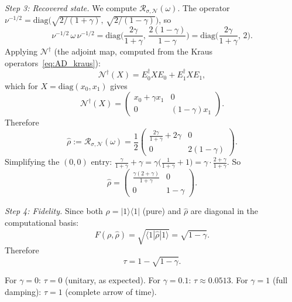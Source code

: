 \documentclass[prl,twocolumn,superscriptaddress,longbibliography]{revtex4-2}
\newcommand{\Petz}{\mathcal{R}}
\newcommand{\chan}{\mathcal{N}}
\newcommand{\ket}[1]{|#1\rangle}
\newcommand{\bra}[1]{\langle#1|}
\newcommand{\tauasym}{\tau}
\begin{document}
\emph{Step 3: Recovered state.}
We compute $\Petz_{\sigma,\chan}(\omega)$.  The operator
$\nu^{-1/2} = \mathrm{diag}\!\big(\sqrt{2/(1+\gamma)},\,
\sqrt{2/(1-\gamma)}\big)$, so
\begin{equation}
\nu^{-1/2}\,\omega\,\nu^{-1/2}
= \mathrm{diag}\!\bigg(\frac{2\gamma}{1+\gamma},\,
\frac{2(1-\gamma)}{1-\gamma}\bigg)
= \mathrm{diag}\!\bigg(\frac{2\gamma}{1+\gamma},\, 2\bigg).
\end{equation}
Applying $\chan^\dagger$ (the adjoint map, computed from the Kraus
operators~\eqref{eq:AD_kraus}):
\begin{equation}
\chan^\dagger(X) = E_0^\dagger X E_0 + E_1^\dagger X E_1,
\end{equation}
which for $X = \mathrm{diag}(x_0, x_1)$ gives
\begin{equation}
\chan^\dagger(X) = \begin{pmatrix}
x_0 + \gamma x_1 & 0 \\
0 & (1-\gamma) x_1
\end{pmatrix}.
\end{equation}
Therefore
\begin{equation}
\hat{\rho} := \Petz_{\sigma,\chan}(\omega) = \frac{1}{2}
\begin{pmatrix}
\frac{2\gamma}{1+\gamma} + 2\gamma & 0 \\
0 & 2(1-\gamma)
\end{pmatrix}.
\end{equation}
Simplifying the $(0,0)$ entry:
$\frac{\gamma}{1+\gamma} + \gamma
= \gamma\big(\frac{1}{1+\gamma} + 1\big)
= \gamma \cdot \frac{2+\gamma}{1+\gamma}$.  So
\begin{equation}
\hat{\rho} = \begin{pmatrix}
\frac{\gamma(2+\gamma)}{1+\gamma} & 0 \\
0 & 1 - \gamma
\end{pmatrix}.
\end{equation}

\emph{Step 4: Fidelity.}
Since both $\rho = \ket{1}\!\bra{1}$ (pure) and $\hat{\rho}$ are
diagonal in the computational basis:
\begin{equation}
F(\rho, \hat{\rho}) = \sqrt{\bra{1}\hat{\rho}\ket{1}}
= \sqrt{1 - \gamma}.
\end{equation}
Therefore
\begin{equation}
\tauasym = 1 - \sqrt{1 - \gamma}.
\label{eq:tau_AD}
\end{equation}

For $\gamma = 0$: $\tauasym = 0$ (unitary, as expected).
For $\gamma = 0.1$: $\tauasym \approx 0.0513$.
For $\gamma = 1$ (full damping): $\tauasym = 1$ (complete arrow of time).
\end{document}
